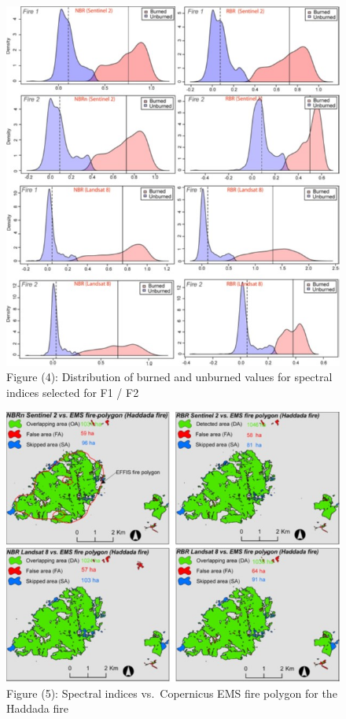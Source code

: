 \documentclass[
  letterpaper,
  DIV=11,
  numbers=noendperiod]{scrreprt}
\begin{document}
\begin{figure}

{\centering \includegraphics[width=5.20833in,height=\textheight]{application 3.jpg}

}

\caption{Figure (4): Distribution of burned and unburned values for
spectral indices selected for F1 / F2}

\end{figure}

\begin{figure}

{\centering \includegraphics[width=5.20833in,height=\textheight]{application 4.jpg}

}

\caption{Figure (5): Spectral indices vs.~Copernicus EMS fire polygon
for the Haddada fire}

\end{figure}
\end{document}
